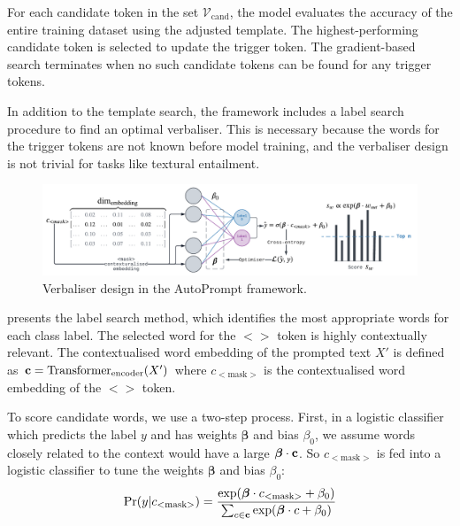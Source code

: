 For each candidate token in the set $\mathcal{V}_{\text{cand}}$, the model evaluates the accuracy of the entire training dataset using the adjusted template. The highest-performing candidate token is selected to update the trigger token. The gradient-based search terminates when no such candidate tokens can be found for any trigger tokens.

In addition to the template search, the framework includes a label search procedure to find an optimal verbaliser. This is necessary because the words for the trigger tokens are not known before model training, and the verbaliser design is not trivial for tasks like textural entailment.

\begin{figure}[!ht]
    \centering
    \includegraphics[width=\hsize]{figures/preparation_media/prepare-auto-verb.pdf}
    \caption{Verbaliser design in the AutoPrompt framework.}
    \label{fig:prepare-auto-verb}
\end{figure}

 presents the label search method, which identifies the most appropriate words for each class label. The selected word for the $<$$>$ token is highly contextually relevant. The contextualised word embedding of the prompted text $X'$ is defined as $\bold{c} = \text{Transformer}_{\text{encoder}}(X')$ where $c_{<\text{mask}>}$ is the contextualised word embedding of the $<$$>$ token. 

To score candidate words, we use a two-step process. First, in a logistic classifier which predicts the label $y$  and has weights $\boldsymbol\beta$ and bias $\beta_0$, we assume words closely related to the context would have a large $\boldsymbol{\beta} \cdot \bold{c}$. So $c_{<\text{mask}>}$ is fed into a logistic classifier to tune the weights $\boldsymbol\beta$ and bias $\beta_0$:
\begin{equation}
    \Pr(y|c_{<\text{mask}>}) = \frac{\exp(\boldsymbol{\beta} \cdot  c_{<\text{mask}>} + \beta_0)}{\sum_{c \in \bold{c}} \exp(\boldsymbol{\beta} \cdot  c + \beta_0)}
\end{equation} 

